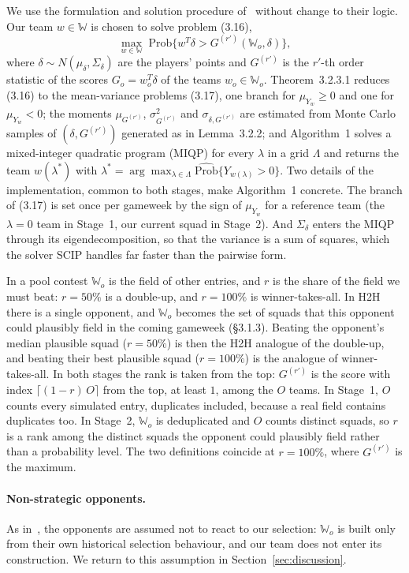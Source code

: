 \documentclass[12pt,oneside,a4paper]{book}
\theoremstyle{definition}
\theoremstyle{remark}
\begin{document}
	We use the formulation and solution procedure of~\cite{haugh2021} without change to their
	logic. Our team $w \in \mathbb{W}$ is chosen to solve problem (3.16),
	\[
	\max_{w\in\mathbb{W}} \; \mathrm{Prob}\bigl\{ w^{T}\delta > G^{(r')}(\mathbb{W}_o,\delta) \bigr\},
	\]
	where $\delta \sim N(\mu_\delta,\Sigma_\delta)$ are the players' points and $G^{(r')}$ is the
	$r'$-th order statistic of the scores $G_o = w_o^{T}\delta$ of the teams $w_o\in\mathbb{W}_o$.
	Theorem~3.2.3.1 reduces (3.16) to the mean-variance problems (3.17), one branch for
	$\mu_{Y_w}\ge 0$ and one for $\mu_{Y_w}<0$; the moments $\mu_{G^{(r')}}$,
	$\sigma^2_{G^{(r')}}$ and $\sigma_{\delta,G^{(r')}}$ are estimated from Monte Carlo samples
	of $(\delta,G^{(r')})$ generated as in Lemma~3.2.2; and Algorithm~1 solves a mixed-integer
	quadratic program (MIQP) for every $\lambda$ in a grid $\Lambda$ and returns the team $w(\lambda^*)$
	with $\lambda^* = \arg\max_{\lambda\in\Lambda}\widehat{\mathrm{Prob}}\{Y_{w(\lambda)}>0\}$.
	Two details of the implementation, common to both stages, make Algorithm~1 concrete. The branch
	of (3.17) is set once per gameweek by the sign of $\mu_{Y_w}$ for a reference team (the
	$\lambda=0$ team in Stage~1, our current squad in Stage~2). And $\Sigma_\delta$ enters the MIQP
	through its eigendecomposition, so that the variance is a sum of squares, which the solver SCIP
	handles far faster than the pairwise form.

	In a pool contest $\mathbb{W}_o$ is the field of other entries, and $r$ is the share of the
	field we must beat: $r=50\%$ is a double-up, and $r=100\%$ is winner-takes-all. In H2H there is
	a single opponent, and $\mathbb{W}_o$ becomes the set of squads that this opponent could
	plausibly field in the coming gameweek (§3.1.3). Beating the opponent's median plausible squad
	($r=50\%$) is then the H2H analogue of the double-up, and beating their best plausible squad
	($r=100\%$) is the analogue of winner-takes-all. In both stages the rank is taken from the top:
	$G^{(r')}$ is the score with index $\lceil (1-r)\,O\rceil$ from the top, at least $1$, among the
	$O$ teams. In Stage~1, $O$ counts every simulated entry, duplicates included, because a real
	field contains duplicates too. In Stage~2, $\mathbb{W}_o$ is deduplicated and $O$ counts
	distinct squads, so $r$ is a rank among the distinct squads the opponent could plausibly field
	rather than a probability level. The two definitions coincide at $r=100\%$, where $G^{(r')}$ is
	the maximum.

	\paragraph{Non-strategic opponents.} As in~\cite{haugh2021}, the opponents are assumed not to
	react to our selection: $\mathbb{W}_o$ is built only from their own historical selection
	behaviour, and our team does not enter its construction. We return to this assumption in
	Section~\ref{sec:discussion}.
\end{document}
